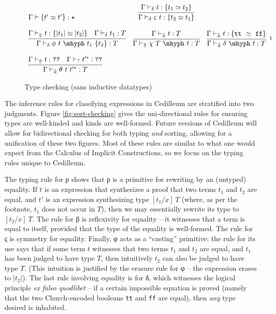 \documentclass{article}
\newcommand{\absu}[3]{{#1}\, #2.\, #3}
\newcommand{\decdir}{\vdash_{\delta}}
\newcommand{\decsyn}{\vdash_{\Uparrow}}
\newcommand{\decchk}{\vdash_{\Downarrow}}
\begin{document}
\begin{figure}[h]
\[\begin{array}{lcr}
        { \Gamma \vdash \{ t' \simeq t' \} : \star }
      & \infer
        { \Gamma \decdir \varsigma\ t : \{ t_2 \simeq t_1 \} }
        { \Gamma \decdir t : \{ t_1 \simeq t_2 \}}
      \\ \\ \infer
      { \Gamma \decdir \phi\ t\ \mhyph\ t_1\ \{t_2\} : T}
      { \Gamma \decchk t : \{ |t_1| \simeq |t_2| \}
        & \Gamma \decdir t_1 : T}
      & \infer
        { \Gamma \decsyn \chi\ T\ \mhyph\ t : T }
        { \Gamma \decchk t : T }
      & \infer[\footnotemark]
        { \Gamma \decchk \delta\ \mhyph\ t : T }
        { \Gamma \decchk t : \{ \texttt{tt}\ \simeq\ \texttt{ff} \}}
      \\ \\ \infer
      { \Gamma \decchk \theta\ t\ t'^* : T }
      { \Gamma \decsyn t : \texttt{??}
        & \Gamma \vdash_? t'^* : \texttt{??} }
    \end{array}
  \]
  \caption{Type checking \fbox{$\Gamma \decdir s : C$} (sans inductive datatypes)}
  \label{fig:type-checking}
\end{figure}
\footnotetext{Where $\texttt{tt} = \absu{\lambda}{x}{\absu{\lambda}{y}{x}}$ and
  $\texttt{ff} = \absu{\lambda}{x}{\absu{\lambda}{y}{y}}$}

The inference rules for classifying expressions in Cedilleum are stratified into
two judgments. Figure \ref{fig:sort-checking} gives the uni-directional rules
for ensuring types are well-kinded and kinds are well-formed. Future versions of
Cedilleum will allow for bidirectional checking for both typing \textit{and}
sorting, allowing for a unification of these two figures. Most of these rules
are similar to what one would expect from the Calculus of Implicit
Constructions, so we focus on the typing rules unique to Cedilleum.

The typing rule for ρ shows that ρ is a primitive for rewriting by an (untyped)
equality. If $t$ is an expression that synthesizes a proof that two terms $t_1$
and $t_2$ are equal, and $t'$ is an expression synthesizing type $[t_1/x]\ T$
(where, as per the footnote, $t_1$ does not occur in $T$), then we may
essentially rewrite its type to $[t_2/x]\ T$. The rule for β is reflexivity for
equality -- it witnesses that a term is equal to itself, provided that the type
of the equality is well-formed. The rule for ς is symmetry for equality.
Finally, φ acts as a ``casting'' primitive: the rule for its use says that if
some term $t$ witnesses that two terms $t_1$ and $t_2$ are equal, and $t_1$ has
been judged to have type $T$, then intuitively $t_2$ can also be judged to have
type $T$. (This intuition is justified by the erasure rule for φ -- the
expression erases to $|t_2|$). The last rule involving equality is for δ, which
witnesses the logical principle \textit{ex falso quodlibet} -- if a certain
impossible equation is proved (namely that the two Church-encoded booleans
\texttt{tt} and \texttt{ff} are equal), then \textit{any} type desired is
inhabited.
\end{document}
